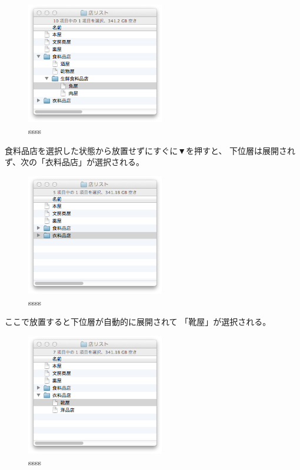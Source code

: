 \documentclass[twoside]{wiss}
\def\▼{▼}
\begin{document}
\begin{figure}[H]
\centerline{\includegraphics[width=60mm,bb=0 0 344 304]{figures/1b1955309d3baefda8e1b614cf06df62.png}}
\caption{ssss}
\label{screenshot}
\end{figure}



食料品店を選択した状態から放置せずにすぐに{\▼}を押すと、
下位層は展開されず、次の「衣料品店」が選択される。

\begin{figure}[H]
\centerline{\includegraphics[width=60mm,bb=0 0 344 304]{figures/c5c757d8f79d5a8a9c85eef25600ba66.png}}
\caption{ssss}
\label{screenshot}
\end{figure}

ここで放置すると下位層が自動的に展開されて
「靴屋」が選択される。

\begin{figure}[H]
\centerline{\includegraphics[width=60mm,bb=0 0 344 304]{figures/fddd5777d39924ea3f0220ae39a604c1.png}}
\caption{ssss}
\label{screenshot}
\end{figure}
\end{document}
